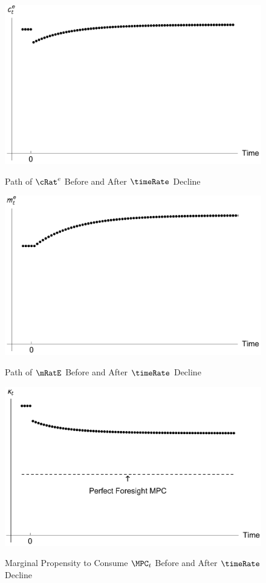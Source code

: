 \documentclass{handout}
\begin{document}
\begin{figure}
\caption{Path of ${\cRat}^{e}$ Before and After $\timeRate$ Decline}
\includegraphics[width=6in]{../Figures/cPathAfterThetaDrop}
\label{fig:cPathAfterThetaDrop}
\end{figure}

\begin{figure}
\caption{Path of $\mRatE$ Before and After $\timeRate$ Decline}
\includegraphics[width=6in]{../Figures/mPathAfterThetaDrop}
\label{fig:mPathAfterThetaDrop}
\end{figure}


\begin{figure}
\caption{Marginal Propensity to Consume $\MPC_{t}$ Before and After $\timeRate$ Decline}
\medskip
\includegraphics[width=6in]{../Figures/MPCPathAfterThetaDrop}
\label{fig:MPCPathAfterThetaDrop}
\end{figure}
\end{document}
